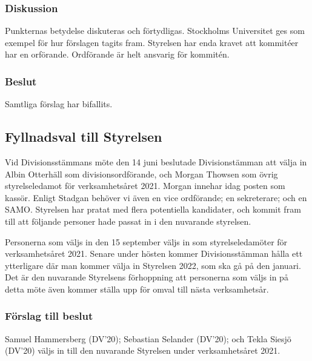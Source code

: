 \documentclass[protokoll]{dvd}
\begin{document}
\subsubsection{Diskussion}
Punkternas betydelse diskuteras och förtydligas. Stockholms Universitet ges som exempel för hur förslagen tagits fram.
Styrelsen har enda kravet att kommitéer har en orförande. Ordförande är helt ansvarig för kommitén. 

\subsubsection{Beslut}
\begin{attsatser}
	\item Samtliga förslag har bifallits.
\end{attsatser}


\newpage
\subsection{Fyllnadsval till Styrelsen}

Vid Divisionsstämmans möte den 14 juni beslutade Divisionstämman att välja in Albin Otterhäll som divisionsordförande, och Morgan Thowsen som övrig styrelseledamot för verksamhetsåret 2021.
Morgan innehar idag posten som kassör.
Enligt Stadgan behöver vi även en vice ordförande; en sekreterare; och en SAMO.
Styrelsen har pratat med flera potentiella kandidater, och kommit fram till att följande personer hade passat in i den nuvarande styrelsen.

Personerna som väljs in den 15 september väljs in som styrelseledamöter för verksamhetsåret 2021.
Senare under hösten kommer Divisionsstämman hålla ett ytterligare där man kommer välja in Styrelsen 2022, som ska gå på den januari.
Det är den nuvarande Styrelsens förhoppning att personerna som väljs in på detta möte även kommer ställa upp för omval till nästa verksamhetsår.

\subsubsection*{Förslag till beslut}

\begin{attsatser}
	\item Samuel Hammersberg (DV'20); Sebastian Selander (DV'20); och Tekla Siesjö (DV'20) väljs in till den nuvarande Styrelsen under verksamhetsåret 2021.
\end{attsatser}
\end{document}
